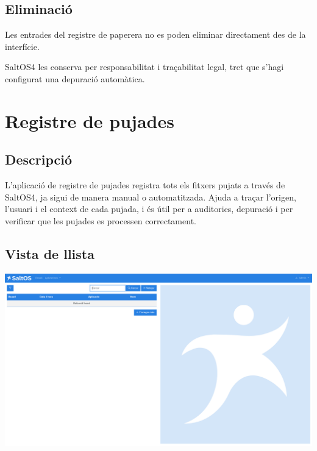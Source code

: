 \documentclass[a4paper]{article}
\begin{document}
\hypertarget{toc35}{}
\subsection{Eliminació}

Les entrades del registre de paperera no es poden eliminar directament des de la interfície.

SaltOS4 les conserva per responsabilitat i traçabilitat legal, tret que s'hagi configurat una depuració automàtica.


\hypertarget{toc36}{}
\section{Registre de pujades}

\hypertarget{toc37}{}
\subsection{Descripció}

L'aplicació de registre de pujades registra tots els fitxers pujats a través de SaltOS4, ja sigui de manera manual o automatitzada.
Ajuda a traçar l'origen, l'usuari i el context de cada pujada, i és útil per a auditories, depuració i per verificar que les pujades es processen correctament.

\hypertarget{toc38}{}
\subsection{Vista de llista}

\begin{center}\includegraphics[width=1\textwidth]{../ujest/snaps/test-screenshots-js-screenshots-common-uploadlog-list-ca-es-1-snap.png}\end{center}
\end{document}
